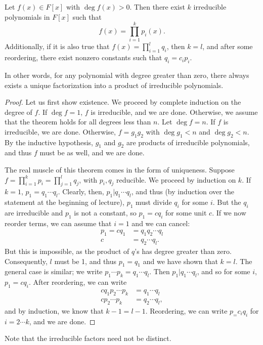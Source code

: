 \documentclass{../mathnotes}
\begin{document}
\begin{thm}
    Let $f(x)\in F[x]$ with $\deg f(x)>0$. Then there exist $k$ irreducible polynomials in $F[x]$ such
    that
    \[f(x)=\prod_{i=1}^k p_i(x).\]
    Additionally, if it is also true that $f(x)=\prod_{i=1}^lq_i$, then $k=l$, and after some reordering,
    there exist nonzero constants such that $q_i=c_ip_i$.

    In other words, for any polynomial with degree greater than zero, there always exists a unique
    factorization into a product of irreducible polynomials.
\end{thm}
\begin{proof}
    Let us first show existence. We proceed by complete induction on the degree of $f$.
    If $\deg f=1$, $f$ is irreducible, and we are done. Otherwise, we assume that the theorem
    holds for all degrees less than $n$. Let $\deg f=n$. If $f$ is irreducible, we are done.
    Otherwise, $f=g_1g_2$ with $\deg g_1<n$ and $\deg g_2<n$. By the inductive hypothesis,
    $g_1$ and $g_2$ are products of irreducible polynomials, and thus $f$ must be as well, and we are done.

    The real muscle of this theorem comes in the form of uniqueness. Suppose $f=\prod_{i=1}^kp_i=\prod_{j=1}^lq_j$,
    with $p_i,q_j$ reducible. We proceed by induction on $k$. If $k=1$, $p_1=q_1\cdots q_l$. Clearly, then,
    $p_1|q_1\cdots q_l$, and thus (by induction over the statement at the beginning of lecture), $p_1$ must divide
    $q_i$ for some $i$. But the $q_i$ are irreducible and $p_1$ is not a constant, so $p_1=cq_i$ for some unit
    $c$. If we now reorder terms, we can assume that $i=1$ and we can cancel:
    \begin{align*}
        p_1=cq_1&=q_1q_2\cdots q_l\\
        c&=q_2\cdots q_l.
    \end{align*}
    But this is impossible, as the product of $q$'s has degree greater than zero. Consequently, $l$ must be 1, and
    thus $p_1=q_1$ and we have shown that $k=l$. The general case is similar; we write $p_1\cdots p_k=q_1\cdots q_l$. Then $p_1|q_1\cdots q_l$,
    and so for some $i$, $p_1=cq_i$. After reordering, we can write
    \begin{align*}
        cq_1p_2\cdots p_k&=q_1\cdots q_l\\
        cp_2\cdots p_k&=q_2 \cdots q_l,
    \end{align*}
    and by induction, we know that $k-1=l-1$. Reordering, we can write $p_=c_iq_i$ for $i=2\cdots k$,
    and we are done.
\end{proof}
Note that the irreducible factors need not be distinct.
\end{document}

